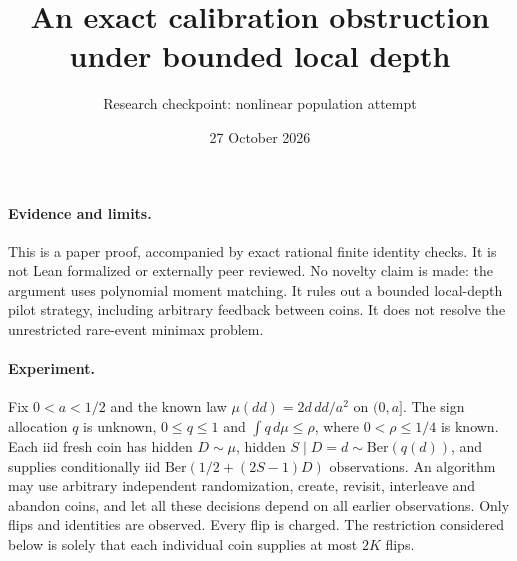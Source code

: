 \documentclass[11pt]{article}
\title{An exact calibration obstruction under bounded local depth}
\author{Research checkpoint: nonlinear population attempt}
\date{27 October 2026}
\begin{document}
\maketitle
\paragraph{Evidence and limits.}
This is a paper proof, accompanied by exact rational finite identity checks.
It is not Lean formalized or externally peer reviewed. No novelty claim is
made: the argument uses polynomial moment matching. It rules out a bounded
local-depth pilot strategy, including arbitrary feedback between coins. It
does not resolve the unrestricted rare-event minimax problem.

\paragraph{Experiment.}
Fix $0<a<1/2$ and the known law $\mu(dd)=2d\,dd/a^2$ on $(0,a]$.
The sign allocation $q$ is unknown, $0\le q\le1$ and $\int q\,d\mu\le\rho$,
where $0<\rho\le1/4$ is known. Each iid fresh coin has hidden $D\sim\mu$,
hidden $S\mid D=d\sim\mathrm{Ber}(q(d))$, and supplies conditionally iid
$\mathrm{Ber}(1/2+(2S-1)D)$ observations. An algorithm may use arbitrary
independent randomization, create, revisit, interleave and abandon coins, and
let all these decisions depend on all earlier observations. Only flips and
identities are observed. Every flip is charged. The restriction considered
below is solely that each individual coin supplies at most $2K$ flips.
\end{document}
